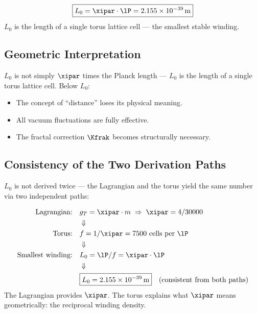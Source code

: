 \begin{keyresult}
\begin{equation}
	\boxed{L_0 = \xipar \cdot \lP = 2{.}155 \times 10^{-39}\,\text{m}}
\end{equation}
$L_0$ is the length of a single torus lattice cell — the smallest stable winding.
\end{keyresult}

\subsection{Geometric Interpretation}

$L_0$ is not simply $\xipar$ times the Planck length — $L_0$ is the length of a single torus lattice cell. Below $L_0$:
\begin{itemize}
	\item The concept of ``distance'' loses its physical meaning.
	\item All vacuum fluctuations are fully effective.
	\item The fractal correction $\Kfrak$ becomes structurally necessary.
\end{itemize}

\subsection{Consistency of the Two Derivation Paths}

$L_0$ is not derived twice — the Lagrangian and the torus yield the same number via two independent paths:

\begin{keyresult}
\begin{align}
	\text{Lagrangian:} \quad & g_T = \xipar \cdot m \;\Rightarrow\; \xipar = 4/30000 \notag \\
	& \Downarrow \notag \\
	\text{Torus:} \quad & f = 1/\xipar = 7500 \text{ cells per } \lP \notag \\
	& \Downarrow \notag \\
	\text{Smallest winding:} \quad & L_0 = \lP / f = \xipar \cdot \lP \notag \\
	& \Downarrow \notag \\
	& \boxed{L_0 = 2{.}155 \times 10^{-39}\,\text{m}} \quad \text{(consistent from both paths)}
\end{align}
The Lagrangian provides $\xipar$. The torus explains what $\xipar$ means geometrically: the reciprocal winding density.
\end{keyresult}

